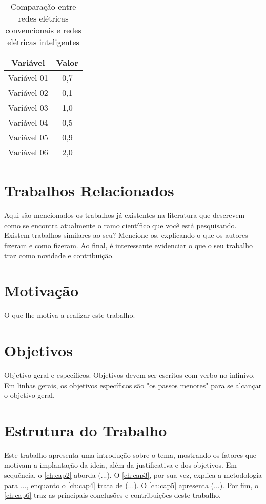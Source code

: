 \begin{table}[!ht]
\centering
\begin{tabular}{lc}
\toprule
\multicolumn{1}{c}{\textbf{Variável}} & \multicolumn{1}{c}{\textbf{Valor}} \\
\midrule
Variável 01 & 0,7 \\
Variável 02 & 0,1 \\
Variável 03 & 1,0 \\
Variável 04 & 0,5 \\
Variável 05 & 0,9 \\
Variável 06 & 2,0 \\
\bottomrule
\end{tabular}%
\caption{Comparação entre redes elétricas convencionais e redes elétricas inteligentes}
\label{tab-comparativa}
\end{table}

\section{Trabalhos Relacionados}
Aqui são mencionados os trabalhos já existentes na literatura que descrevem como se encontra atualmente o ramo científico que você está pesquisando. Existem trabalhos similares ao seu? Mencione-os, explicando o que os autores fizeram e como fizeram. Ao final, é interessante evidenciar o que o seu trabalho traz como novidade e contribuição.
\lipsum[1-1]

\section{Motivação}
O que lhe motiva a realizar este trabalho.

\section{Objetivos}
Objetivo geral e específicos. Objetivos devem ser escritos com verbo no infinivo. Em linhas gerais, os objetivos específicos são "os passos menores" para se alcançar o objetivo geral.

\section{Estrutura do Trabalho}
Este trabalho apresenta uma introdução sobre o tema, mostrando os fatores que motivam a implantação da ideia, além da justificativa e dos objetivos. Em sequência, o \autoref{ch:cap2} aborda (...). O \autoref{ch:cap3}, por sua vez, explica a metodologia para ..., enquanto o \autoref{ch:cap4} trata de (...). O \autoref{ch:cap5} apresenta (...). Por fim, o \autoref{ch:cap6} traz as principais conclusões e contribuições deste trabalho.